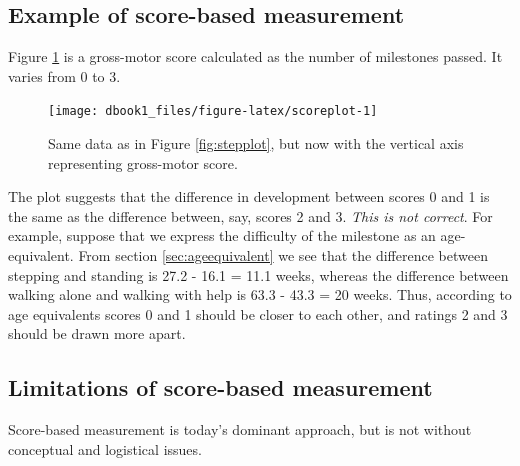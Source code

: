 \documentclass[
]{book}
\begin{document}
\hypertarget{example-of-score-based-measurement}{%
\subsection{Example of score-based measurement}\label{example-of-score-based-measurement}}

Figure \ref{fig:scoreplot} is a gross-motor score calculated as the number of milestones passed. It varies from 0 to 3.

\begin{figure}

{\centering \texttt{[image: dbook1\_files/figure-latex/scoreplot-1]} 

}

\caption{Same data as in Figure \ref{fig:stepplot}, but now with the vertical axis representing gross-motor score.}\label{fig:scoreplot}
\end{figure}



The plot suggests that the difference in development between scores 0 and 1 is the same as the difference between, say, scores 2 and 3. \emph{This is not correct}. For example, suppose that we express the difficulty of the milestone as an age-equivalent. From section \ref{sec:ageequivalent} we see that the difference between stepping and standing is 27.2 - 16.1 = 11.1 weeks, whereas the difference between walking alone and walking with help is 63.3 - 43.3 = 20 weeks. Thus, according to age equivalents scores 0 and 1 should be closer to each other, and ratings 2 and 3 should be drawn more apart.

\hypertarget{limitations-of-score-based-measurement}{%
\subsection{Limitations of score-based measurement}\label{limitations-of-score-based-measurement}}

Score-based measurement is today's dominant approach, but is not without conceptual and logistical issues.
\end{document}
